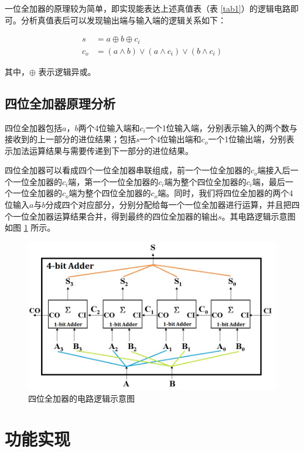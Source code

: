 \documentclass{cumcm}
\numberwithin{equation}{section}
\numberwithin{equation}{subsection}
\begin{document}
一位全加器的原理较为简单，即实现能表达上述真值表（表 \ref{tab1}）的逻辑电路即可。分析真值表后可以发现输出端与输入端的逻辑关系如下：

\begin{equation}\label{eq1}
\begin{aligned}
s &= a \oplus b \oplus c_i \\
c_o &= (a \land b) \lor (a \land c_i) \lor (b \land c_i)
\end{aligned}
\end{equation}

其中，$\oplus$ 表示逻辑异或。

\subsection{四位全加器原理分析}\label{section2.2}
四位全加器包括$a$，$b$两个4位输入端和$c_i$一个1位输入端，分别表示输入的两个数与接收到的上一部分的进位结果；包括$s$一个4位输出端和$c_o$一个1位输出端，分别表示加法运算结果与需要传递到下一部分的进位结果。

四位全加器可以看成四个一位全加器串联组成，前一个一位全加器的$c_o$端接入后一个一位全加器的$c_i$端，第一个一位全加器的$c_i$端为整个四位全加器的$c_i$端，最后一个一位全加器的$c_o$端为整个四位全加器的$c_o$端。同时，我们将四位全加器的两个4位输入$a$与$b$分成四个对应部分，分别分配给每一个一位全加器进行运算，并且把四个一位全加器运算结果合并，得到最终的四位全加器的输出$s$。其电路逻辑示意图如图 \ref{fig1} 所示。

\begin{figure}[htbp]
    \centering
    \includegraphics[width=6in]{4bit-adder.jpg}
    \caption{四位全加器的电路逻辑示意图}
    \label{fig1}
\end{figure}

\section{功能实现}\label{section3}
\end{document}
